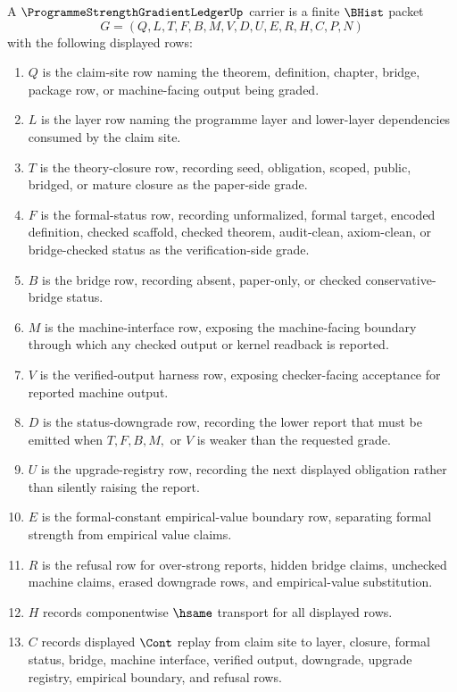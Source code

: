 \begin{definition}
\label{def:programme-strength-gradient-ledger-carrier}
A $\ProgrammeStrengthGradientLedgerUp$ carrier is a finite $\BHist$ packet
$$
G=(Q,L,T,F,B,M,V,D,U,E,R,H,C,P,N)
$$
with the following displayed rows:
\begin{enumerate}
\item $Q$ is the claim-site row naming the theorem, definition, chapter, bridge, package row, or machine-facing output being graded.
\item $L$ is the layer row naming the programme layer and lower-layer dependencies consumed by the claim site.
\item $T$ is the theory-closure row, recording seed, obligation, scoped, public, bridged, or mature closure as the paper-side grade.
\item $F$ is the formal-status row, recording unformalized, formal target, encoded definition, checked scaffold, checked theorem, audit-clean, axiom-clean, or bridge-checked status as the verification-side grade.
\item $B$ is the bridge row, recording absent, paper-only, or checked conservative-bridge status.
\item $M$ is the machine-interface row, exposing the machine-facing boundary through which any checked output or kernel readback is reported.
\item $V$ is the verified-output harness row, exposing checker-facing acceptance for reported machine output.
\item $D$ is the status-downgrade row, recording the lower report that must be emitted when $T,F,B,M,$ or $V$ is weaker than the requested grade.
\item $U$ is the upgrade-registry row, recording the next displayed obligation rather than silently raising the report.
\item $E$ is the formal-constant empirical-value boundary row, separating formal strength from empirical value claims.
\item $R$ is the refusal row for over-strong reports, hidden bridge claims, unchecked machine claims, erased downgrade rows, and empirical-value substitution.
\item $H$ records componentwise $\hsame$ transport for all displayed rows.
\item $C$ records displayed $\Cont$ replay from claim site to layer, closure, formal status, bridge, machine interface, verified output, downgrade, upgrade registry, empirical boundary, and refusal rows.

\end{enumerate}
\end{definition}
